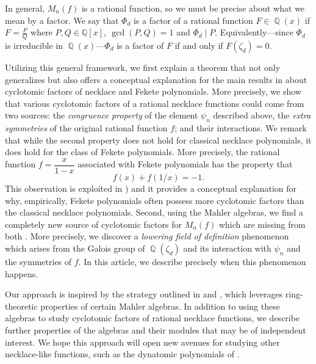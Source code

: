 \documentclass[12t,a4paper]{amsart}
\theoremstyle{definition}
\DeclareMathOperator{\Q}{\mathbb{Q}}
\numberwithin{equation}{section}
\begin{document}
In general, $M_n(f)$ is a rational function, so we must be precise about what we mean by a factor. We say that $\Phi_d$ is a factor of a rational function $F \in \Q(x)$ if $ F=\frac{P}{Q}$ where  $P,Q\in\mathbb{Q}[x],\ \gcd(P,Q)=1$
and $\Phi_d\mid P$. Equivalently—since $\Phi_d$ is irreducible in $\Q(x)$—$\Phi_d$ is a factor of $F$ if and only if $F(\zeta_d)=0$.




Utilizing this general framework, we first explain a theorem that not only generalizes but also offers a conceptual explanation for the main results in \cite{chidambaram2023fekete, hyde2022cyclotomic} about cyclotomic factors of necklace and Fekete polynomials. More precisely, we show that various cyclotomic factors of a rational necklace functions could come from two sources: the \textit{congruence property} of the element $\psi_n$ described above, the   \textit{extra symmetries} of the original rational function $f$; and their interactions. We remark that while the second property does not hold for classical necklace polynomials, it does hold for the class of Fekete polynomials. More precisely, the rational function $f=\dfrac{x}{1-x}$ associated with Fekete polynomials has the property that 
\[ f(x)+f(1/x)=-1. \] 
This observation is exploited in \cite[Theorem 2.19]{chidambaram2023fekete}) and it provides a conceptual explanation for why, empirically, Fekete polynomials often possess more cyclotomic factors than the classical necklace polynomials. Second, using the Mahler algebras, we find a completely new source of cyclotomic factors for $M_n(f)$ which are  missing from both \cite{chidambaram2023fekete,hyde2022cyclotomic}. More precisely, we discover a \textit{lowering field of definition} phenomenon which arises from the Galois group of $\Q(\zeta_d)$ and its interaction with $\psi_n$ and the symmetries of $f.$ In this article, we describe precisely when this phenomenon happens. 




Our approach is inspired by the strategy outlined in \cite{hyde2019polynomial, hyde2022cyclotomic} and \cite{Dynatomic2022}, which leverages ring-theoretic properties of certain Mahler algebras. In addition to using these algebras to study cyclotomic factors of rational necklace functions, we describe further properties of the algebras and their modules that may be of independent interest. We hope this approach will open new avenues for studying other necklace-like functions, such as the dynatomic polynomials of \cite{Dynatomic2022}.
\end{document}
